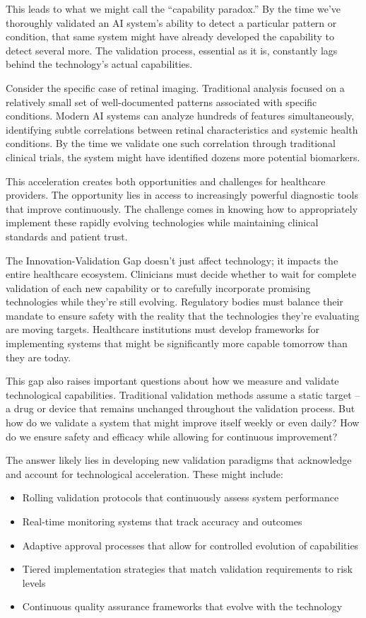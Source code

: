 \documentclass[
  Letterpaper,
]{scrbook}
\providecommand{\tightlist}{%
  \setlength{\itemsep}{0pt}\setlength{\parskip}{0pt}}\usepackage{longtable,booktabs,array}
\begin{document}
This leads to what we might call the ``capability paradox.'' By the time
we've thoroughly validated an AI system's ability to detect a particular
pattern or condition, that same system might have already developed the
capability to detect several more. The validation process, essential as
it is, constantly lags behind the technology's actual capabilities.

Consider the specific case of retinal imaging. Traditional analysis
focused on a relatively small set of well-documented patterns associated
with specific conditions. Modern AI systems can analyze hundreds of
features simultaneously, identifying subtle correlations between retinal
characteristics and systemic health conditions. By the time we validate
one such correlation through traditional clinical trials, the system
might have identified dozens more potential biomarkers.

This acceleration creates both opportunities and challenges for
healthcare providers. The opportunity lies in access to increasingly
powerful diagnostic tools that improve continuously. The challenge comes
in knowing how to appropriately implement these rapidly evolving
technologies while maintaining clinical standards and patient trust.

The Innovation-Validation Gap doesn't just affect technology; it impacts
the entire healthcare ecosystem. Clinicians must decide whether to wait
for complete validation of each new capability or to carefully
incorporate promising technologies while they're still evolving.
Regulatory bodies must balance their mandate to ensure safety with the
reality that the technologies they're evaluating are moving targets.
Healthcare institutions must develop frameworks for implementing systems
that might be significantly more capable tomorrow than they are today.

This gap also raises important questions about how we measure and
validate technological capabilities. Traditional validation methods
assume a static target -- a drug or device that remains unchanged
throughout the validation process. But how do we validate a system that
might improve itself weekly or even daily? How do we ensure safety and
efficacy while allowing for continuous improvement?

The answer likely lies in developing new validation paradigms that
acknowledge and account for technological acceleration. These might
include:

\begin{itemize}
\tightlist
\item
  Rolling validation protocols that continuously assess system
  performance
\item
  Real-time monitoring systems that track accuracy and outcomes
\item
  Adaptive approval processes that allow for controlled evolution of
  capabilities
\item
  Tiered implementation strategies that match validation requirements to
  risk levels
\item
  Continuous quality assurance frameworks that evolve with the
  technology
\end{itemize}
\end{document}
